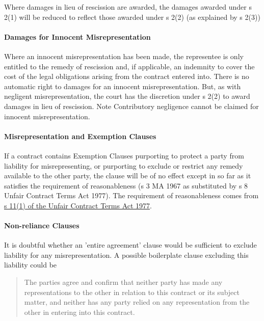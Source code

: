 \documentclass[
]{article}
\begin{document}
Where damages in lieu of rescission are awarded, the damages awarded
under s 2(1) will be reduced to reflect those awarded under s 2(2) (as
explained by s 2(3))

\hypertarget{damages-for-innocent-misrepresentation}{%
\paragraph{Damages for Innocent
Misrepresentation}\label{damages-for-innocent-misrepresentation}}

Where an innocent misrepresentation has been made, the representee is
only entitled to the remedy of rescission and, if applicable, an
indemnity to cover the cost of the legal obligations arising from the
contract entered into. There is no automatic right to damages for an
innocent misrepresentation. But, as with negligent misrepresentation,
the court has the discretion under s 2(2) to award damages in lieu of
rescission. Note Contributory negligence cannot be claimed for innocent
misrepresentation.

\hypertarget{misrepresentation-and-exemption-clauses}{%
\paragraph{Misrepresentation and Exemption
Clauses}\label{misrepresentation-and-exemption-clauses}}

If a contract contains Exemption Clauses purporting to protect a party
from liability for misrepresenting, or purporting to exclude or restrict
any remedy available to the other party, the clause will be of no effect
except in so far as it satisfies the requirement of reasonableness (s 3
MA 1967 as substituted by s 8 Unfair Contract Terms Act 1977). The
requirement of reasonableness comes from
\href{https://www.legislation.gov.uk/ukpga/1977/50/section/11}{s 11(1)
of the Unfair Contract Terms Act 1977}.

\hypertarget{non-reliance-clauses}{%
\paragraph{Non-reliance Clauses}\label{non-reliance-clauses}}

It is doubtful whether an 'entire agreement' clause would be sufficient
to exclude liability for any misrepresentation. A possible boilerplate
clause excluding this liability could be

\begin{quote}
The parties agree and confirm that neither party has made any
representations to the other in relation to this contract or its subject
matter, and neither has any party relied on any representation from the
other in entering into this contract.
\end{quote}
\end{document}
